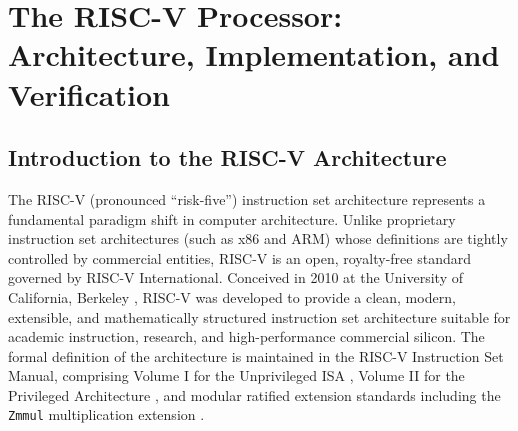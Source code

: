 \chapter{The RISC-V Processor: Architecture, Implementation, and Verification}\label{riscvProcessor}
\localtoc

\section{Introduction to the RISC-V Architecture}\label{riscvIntro}

The RISC-V (pronounced ``risk-five'') instruction set architecture represents a fundamental paradigm shift in computer architecture. Unlike proprietary instruction set architectures (such as x86 and ARM) whose definitions are tightly controlled by commercial entities, RISC-V is an open, royalty-free standard governed by RISC-V International. Conceived in 2010 at the University of California, Berkeley \cite{asanovic2014case,waterman2014riscv,waterman2016design,patterson2017riscvreader}, RISC-V was developed to provide a clean, modern, extensible, and mathematically structured instruction set architecture suitable for academic instruction, research, and high-performance commercial silicon. The formal definition of the architecture is maintained in the RISC-V Instruction Set Manual, comprising Volume I for the Unprivileged ISA \cite{riscv-spec}, Volume II for the Privileged Architecture \cite{riscv-priv-spec}, and modular ratified extension standards including the \texttt{Zmmul} multiplication extension \cite{riscv-zmmul-spec}.

